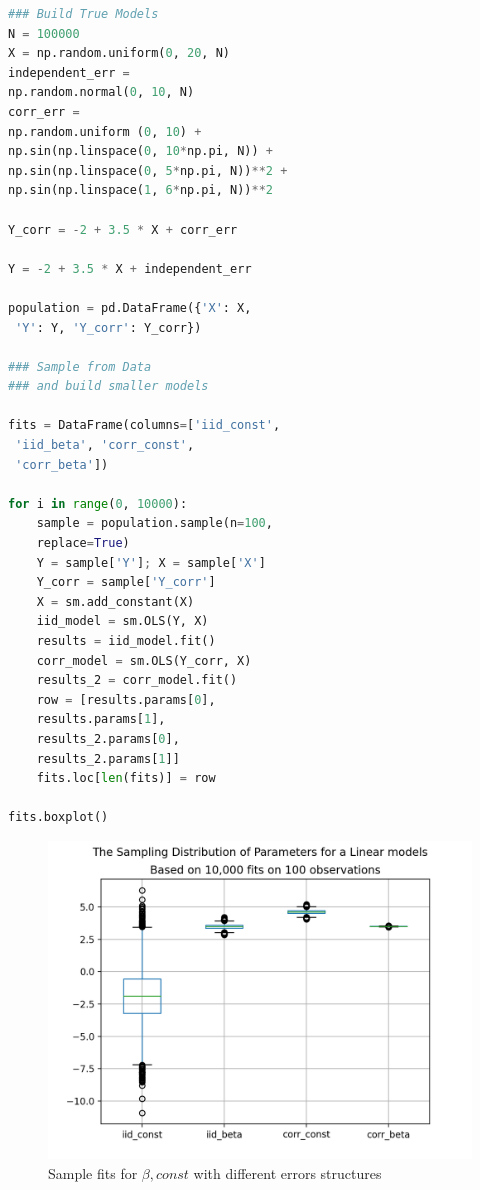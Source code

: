 \documentclass[10pt,a4paper,notitlepage, twocolumn]{article}
\begin{document}
\begin{lstlisting}[language=Python]
### Build True Models
N = 100000
X = np.random.uniform(0, 20, N)
independent_err = 
np.random.normal(0, 10, N)
corr_err = 
np.random.uniform (0, 10) + 
np.sin(np.linspace(0, 10*np.pi, N)) + 
np.sin(np.linspace(0, 5*np.pi, N))**2 + 
np.sin(np.linspace(1, 6*np.pi, N))**2

Y_corr = -2 + 3.5 * X + corr_err

Y = -2 + 3.5 * X + independent_err

population = pd.DataFrame({'X': X,
 'Y': Y, 'Y_corr': Y_corr})

### Sample from Data 
### and build smaller models

fits = DataFrame(columns=['iid_const',
 'iid_beta', 'corr_const', 
 'corr_beta'])
 
for i in range(0, 10000):
    sample = population.sample(n=100, 
    replace=True)
    Y = sample['Y']; X = sample['X']
    Y_corr = sample['Y_corr']
    X = sm.add_constant(X)
    iid_model = sm.OLS(Y, X)
    results = iid_model.fit()
    corr_model = sm.OLS(Y_corr, X)
    results_2 = corr_model.fit()
    row = [results.params[0], 
    results.params[1],
    results_2.params[0], 
    results_2.params[1]]
    fits.loc[len(fits)] = row
    
fits.boxplot()
\end{lstlisting}

\begin{figure}[H]
  \includegraphics[width=\linewidth]{./Plots/distribution_of_beta1.png}
  \caption{Sample fits for $\beta, const$ with different errors structures}
\end{figure}
\end{document}
